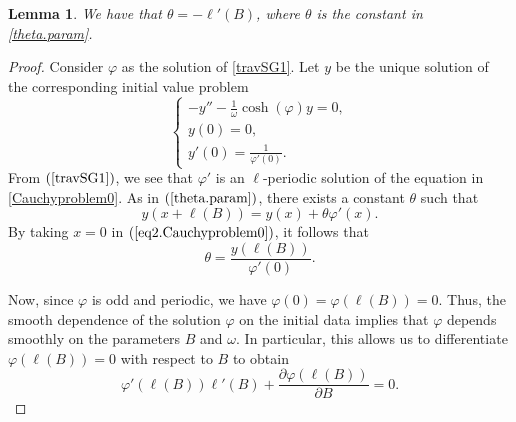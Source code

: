 \documentclass[12pt,reqno,a4paper]{amsart} %
\newtheorem{lema}{Lemma}[section]
\numberwithin{equation}{section}
\numberwithin{figure}{section}
\begin{document}
 		\begin{lema}\label{theta}
 		We have that $ \theta=-\ell'(B)$, where $\theta$ is the constant in \eqref{theta.param}.
 	\end{lema}
 	\begin{proof}
 	Consider $\varphi$ as the solution of \eqref{travSG1}. Let $y$ be the unique solution of the corresponding initial value problem
 	\begin{equation}\label{Cauchyproblem0} 
 		\begin{cases}
 			-	 y''-\frac{1}{\omega}\cosh(\varphi) y=0, \\
 			y(0)= 0, \\
 			y'(0)=\frac{1}{\varphi'(0)}.
 		\end{cases}
 	\end{equation}
 From $(\ref{travSG1})$, we see that $\varphi'$ is an $\ell$-periodic solution of the equation in \eqref{Cauchyproblem0}. As in $(\ref{theta.param})$, there exists a constant $\theta$ such that
 	\begin{equation}\label{eq2.Cauchyproblem0}
 		y(x+\ell(B)) = y(x) + \theta \varphi'(x). 
 	\end{equation} 	
 	By taking $x = 0$ in $(\ref{eq2.Cauchyproblem0})$, it follows that
 	\begin{equation}\label{eq3.Cauchyproblem0}
 		\theta = \frac{y(\ell(B)) }{\varphi'(0) }. 
 	\end{equation}
 	
 	Now, since $\varphi$ is odd and periodic, we have $\varphi(0) = \varphi(\ell(B)) = 0$. Thus, the smooth dependence of the solution $\varphi$ on the initial data implies that $\varphi$ depends smoothly on the parameters $B$ and $\omega$. In particular, this allows us to differentiate $\varphi(\ell(B)) = 0$ with respect to $B$ to obtain
 	\begin{equation}\label{eq5.Cauchyproblem0}
 		\varphi'(\ell(B)) \ell'(B) + \frac{\partial \varphi(\ell(B))}{\partial B} = 0.  
 	\end{equation}
 	

\end{proof}
\end{document}
